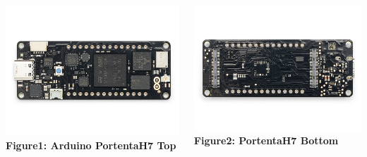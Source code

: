 {
	\begin{columns}
		\centering
		\includegraphics[width=\textwidth]{images/PortentaH7Top.png}
		\vspace{0.2cm}
		\textbf{Figure1: Arduino PortentaH7 Top} \cite{Arduinostore:2024}
		
		\centering
		\includegraphics[width=\textwidth]{images/PortentaH7Bottom.png}
		\vspace{0.2cm}
		\textbf{Figure2: PortentaH7 Bottom} \cite{Arduinostore:2024}
	\end{columns}
}


